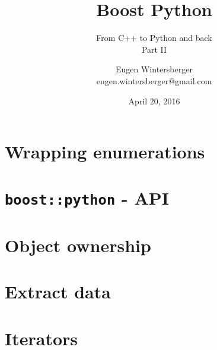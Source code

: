 \documentclass{beamer}
\title{{\Huge Boost Python}}
\subtitle{From C++ to Python and back \\ Part II}
\author{Eugen Wintersberger\\ \small{eugen.wintersberger@gmail.com}}
\date{April 20, 2016}
\begin{document}
\frame{\titlepage}


\part{Wrapping enumerations}
\frame{\partpage}


\part{\texttt{boost::python} - API}
\frame{\partpage}


\part{Object ownership}
\frame{\partpage}


\part{Extract data}
\frame{\partpage}


\part{Iterators}
\frame{\partpage}

\end{document}
